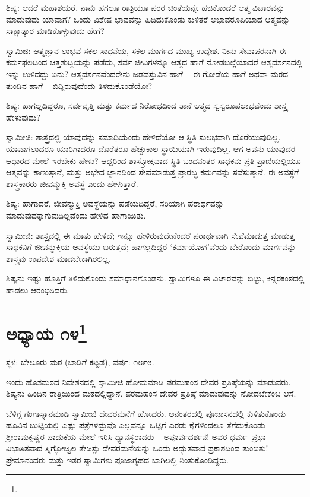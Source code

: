 ಶಿಷ್ಯ: ಆದರೆ ಮಹಾಶಯರೆ, ನಾನು ಹಗಲೂ ರಾತ್ರಿಯೂ ಪರರ ಚಿಂತೆಯನ್ನೇ ಹಚಿಕೊಂಡರೆ ಆತ್ಮ ವಿಚಾರವನ್ನು ಮಾಡುವುದು ಯಾವಾಗ? ಒಂದು ವಿಶೇಷ ಭಾವವನ್ನು ಹಿಡಿದುಕೊಂಡು ಕುಳಿತರೆ ಅಭಾವರೂಪಿಯಾದ ಆತ್ಮವನ್ನು ಸಾಕ್ಷಾತ್ಕಾರ ಮಾಡಿಕೊಳ್ಳುವುದು ಹೇಗೆ?

ಸ್ವಾಮಿಜಿ: ಆತ್ಮಜ್ಞಾನ ಲಾಭವೆ ಸಕಲ ಸಾಧನೆಯ, ಸಕಲ ಮಾರ್ಗದ ಮುಖ್ಯ ಉದ್ದೇಶ. ನೀನು ಸೇವಾಪರನಾಗಿ ಈ ಕರ್ಮಫಲದಿಂದ ಚಿತ್ತಶುದ್ಧಿಯನ್ನು ಪಡೆದು, ಸರ್ವ ಜೀವಿಗಳನ್ನೂ ಆತ್ಮದ ಹಾಗೆ ನೋಡಬಲ್ಲೆಯಾದರೆ ಆತ್ಮದರ್ಶನದಲ್ಲಿ ಇನ್ನು ಉಳಿದದ್ದು ಏನು? ಆತ್ಮದರ್ಶನವೆಂದರೇನು ಜಡವಸ್ತುವಿನ ಹಾಗೆ – ಈ ಗೋಡೆಯ ಹಾಗೆ ಅಥವಾ ಮರದ ತುಂಡಿನ ಹಾಗೆ – ಬಿದ್ದಿರುವುದೆಂದು ತಿಳಿದುಕೊಂಡೆಯೋ?

ಶಿಷ್ಯ: ಹಾಗಲ್ಲದಿದ್ದರೂ, ಸರ್ವವೃತ್ತಿ ಮತ್ತು ಕರ್ಮದ ನಿರೋಧದಿಂದ ತಾನೆ ಆತ್ಮದ ಸ್ವಸ್ವರೂಪಲಾಭವೆಂದು ಶಾಸ್ತ್ರ ಹೇಳುವುದು?

ಸ್ವಾಮೀಜಿ: ಶಾಸ್ತ್ರದಲ್ಲಿ ಯಾವುದನ್ನು ಸಮಾಧಿಯೆಂದು ಹೇಳಿದೆಯೋ ಆ ಸ್ಥಿತಿ ಸುಲಭವಾಗಿ ದೊರೆಯುವುದಿಲ್ಲ. ಯಾವಾಗಲಾದರೂ ಯಾರಿಗಾದರೂ ದೊರೆತರೂ ಹೆಚ್ಚುಕಾಲ ಸ್ಥಾಯಿಯಾಗಿ ಇರುವುದಿಲ್ಲ. ಆಗ ಅವನು ಯಾವುದರ ಆಧಾರದ ಮೇಲೆ ಇರಬೇಕು ಹೇಳು? ಆದ್ದರಿಂದ ಶಾಸ್ತ್ರೋಕ್ತವಾದ ಸ್ಥಿತಿ ಬಂದನಂತರ ಸಾಧಕನು ಪ್ರತಿ ಪ್ರಾಣಿಯಲ್ಲಿಯೂ ಆತ್ಮವನ್ನು ಕಾಣುತ್ತಾನೆ, ಮತ್ತು ಅಭೇದ ಜ್ಞಾನದಿಂದ ಸೇವೆಮಾಡುತ್ತ ಪ್ರಾರಬ್ಧ ಕರ್ಮವನ್ನು ಸವೆಸುತ್ತಾನೆ. ಈ ಅವಸ್ಥೆಗೆ ಶಾಸ್ತ್ರಕಾರರು ಜೀವನ್ಮುಕ್ತಿ ಅವಸ್ಥೆ ಎಂದು ಹೇಳುತ್ತಾರೆ.

ಶಿಷ್ಯ: ಹಾಗಾದರೆ, ಜೀವನ್ಮುಕ್ತಿ ಅವಸ್ಥೆಯನ್ನು ಪಡೆಯದಿದ್ದರೆ, ಸರಿಯಾಗಿ ಪರಾರ್ಥವನ್ನು ಮಾಡುವುದಕ್ಕಾಗುವುದಿಲ್ಲವೆಂದು ಹೇಳಿದ ಹಾಗಾಯಿತು.

ಸ್ವಾಮೀಜಿ: ಶಾಸ್ತ್ರದಲ್ಲಿ ಈ ಮಾತು ಹೇಳಿದೆ; ಇನ್ನೂ ಹೇಳಿರುವುದೇನೆಂದರೆ ಪರಾರ್ಥವಾಗಿ ಸೇವೆಮಾಡುತ್ತ ಮಾಡುತ್ತ ಸಾಧಕನಿಗೆ ಜೀವನ್ಮುಕ್ತಿಯ ಅವಸ್ಥೆಯು ಬರುತ್ತದೆ; ಹಾಗಲ್ಲದಿದ್ದರೆ ‘ಕರ್ಮಯೋಗ’ವೆಂದು ಬೇರೊಂದು ಮಾರ್ಗವನ್ನು ಶಾಸ್ತ್ರವು ಉಪದೇಶ ಮಾಡಬೇಕಾಗಿರಲಿಲ್ಲ.

ಶಿಷ್ಯನು ಇಷ್ಟು ಹೊತ್ತಿಗೆ ತಿಳಿದುಕೊಂಡು ಸಮಾಧಾನಗೊಂಡನು. ಸ್ವಾಮಿಗಳೂ ಈ ವಿಚಾರವನ್ನು ಬಿಟ್ಟು, ಕಿನ್ನರಕಂಠದಲ್ಲಿ ಹಾಡಲು ಆರಂಭಿಸಿದರು.

\newpage

\chapter[ಅಧ್ಯಾಯ ೧೪]{ಅಧ್ಯಾಯ ೧೪\protect\footnote{}}

\centerline{ಸ್ಥಳ: ಬೇಲೂರು ಮಠ (ಬಾಡಿಗೆ ಕಟ್ಟಡ), ವರ್ಷ: ೧೮೯೮.}

ಇಂದು ಹೊಸಮಠದ ನಿವೇಶನದಲ್ಲಿ ಸ್ವಾಮೀಜಿ ಹೋಮಮಾಡಿ ಪರಮಹಂಸ ದೇವರ ಪ್ರತಿಷ್ಠೆಯನ್ನು ಮಾಡುವರು. ಶಿಷ್ಯನು ಹಿಂದಿನ ರಾತ್ರಿಯಿಂದ ಮಠದಲ್ಲಿದ್ದಾನೆ. ಪರಮಹಂಸ ದೇವರ ಪ್ರತಿಷ್ಠೆ ಮಾಡುವುದನ್ನು ನೋಡಬೇಕೆಂಬ ಆಸೆ.

ಬೆಳಿಗ್ಗೆ ಗಂಗಾಸ್ನಾನಮಾಡಿ ಸ್ವಾಮೀಜಿ ದೇವರಮನೆಗೆ ಹೋದರು. ಅನಂತರದಲ್ಲಿ ಪೂಜಾಸನದಲ್ಲಿ ಕುಳಿತುಕೊಂಡು ಹೂವಿನ ಬುಟ್ಟಿಯಲ್ಲಿ ಎಷ್ಟು ಪತ್ರೆಗಳಿದ್ದುವೊ ಎಲ್ಲವನ್ನೂ ಒಟ್ಟಿಗೆ ಎರಡು ಕೈಗಳಿಂದಲೂ ತೆಗೆದುಕೊಂಡು ಶ‍್ರೀರಾಮಕೃಷ್ಣರ ಪಾದುಕೆಯ ಮೇಲೆ ಇರಿಸಿ ಧ್ಯಾನಸ್ಥರಾದರು – ಅಪೂರ್ವದರ್ಶನ! ಅವರ ಧರ್ಮ–ಪ್ರಭಾ–ವಿಭಾಸಿತವಾದ ಸ್ನಿಗ್ಧೋಜ್ವಲ ತೇಜಸ್ಸು ದೇವರಮನೆಯನ್ನು ಒಂದು ಅದ್ಭುತವಾದ ಪ್ರಕಾಶದಿಂದ ತುಂಬಿತು! ಪ್ರೇಮಾನಂದರು ಮತ್ತು ಇತರ ಸ್ವಾಮಿಗಳು ಪೂಜಾಗೃಹದ ಬಾಗಿಲಲ್ಲಿ ನಿಂತುಕೊಂಡಿದ್ದರು.

